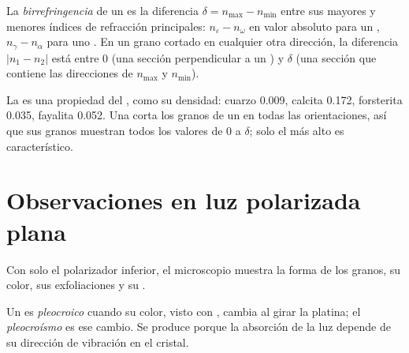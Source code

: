 \begin{definition}\label{def:b1:optical-mineralogy:birefringence}
La \emph{birrefringencia} de un  es la diferencia
$\delta = n_{\max} - n_{\min}$ entre sus mayores y menores índices de refracción principales: $n_\varepsilon - n_\omega$
en valor absoluto para un  , $n_\gamma - n_\alpha$ para uno . En un grano cortado en cualquier
otra dirección, la diferencia $|n_1 - n_2|$ está entre 0 (una sección perpendicular a un ) y $\delta$ (una
sección que contiene las direcciones de $n_{\max}$ y $n_{\min}$).
\end{definition}

La  es una propiedad del , como su densidad: cuarzo \num{0.009}, calcita \num{0.172}, forsterita
\num{0.035}, fayalita \num{0.052}. Una  corta los granos de un  en todas las orientaciones, así que
sus granos muestran todos los valores de 0 a $\delta$; solo el más alto es característico.

\section{Observaciones en luz polarizada plana}

Con solo el polarizador inferior, el microscopio muestra la forma de los granos, su color, sus exfoliaciones y su .

\begin{definition}[Pleocroísmo]\label{def:b1:optical-mineralogy:pleochroism}
Un  es \emph{pleocroico} cuando su color, visto con , cambia al girar la
platina; el \emph{pleocroísmo} es ese cambio. Se produce porque la absorción de la luz depende de su dirección de
vibración en el cristal.
\end{definition}


